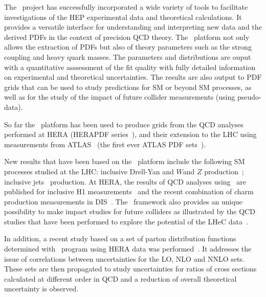 The \fitter\ project has successfully incorporated a wide variety
of tools to facilitate investigations of the HEP experimental data
and theoretical calculations. It provides a versatile interface
for understanding and interpreting new data and the derived PDFs
in the context of precision QCD theory.
The \fitter\ platform not only allows the extraction of PDFs but also of theory 
parameters such as the strong coupling and heavy quark masses. The parameters and distributions are ouput with a
quantitative asssessment of the fit quality with fully detailed information on 
experimental and theoretical uncertainties.
The results are also output to PDF grids that can be used to study predictions for SM or beyond SM processes, as well as for the study of the impact of 
future collider measurements (using pseudo-data).


So far the \fitter\ platform has been used to produce grids 
from the QCD analyses performed at 
HERA (HERAPDF series~\cite{h1zeus:2009wt}), and their extension to the LHC 
using 
measurements from ATLAS~\cite{atlas:strange,atlas:jets} (the first ever ATLAS PDF sets~\cite{atlas:grids}).

New results that have been based on the \fitter\ platform include 
the following SM processes 
studied at the LHC:  inclusive Drell-Yan and $W$and $Z$ 
production~\cite{atlas:strange,atlas:hm,cms:strange};
inclusive jets~\cite{atlas:jets,cms:jets} production.
At HERA, the results of QCD analyses using \fitter\ are 
published for inclusive H1 measurements~\cite{h1:2012kk}
and the recent combination of charm production measurements 
in DIS~\cite{h1zeus:charm}.
The \fitter\ framework also provides an unique possibility to 
make impact studies for future colliders
as illustrated by the QCD studies that have been performed to 
explore the potential of the LHeC data~\cite{lhec:studies}.

In addition, a recent study based on a set of parton distribution functions 
determined with \fitter\ program using HERA data was performed~\cite{hfcorrpaper}.
It addresses the issue of correlations between uncertainties for the LO,
NLO and NNLO sets. These sets are then propagated to study uncertainties 
for ratios of cross sections calculated at different order in QCD and  
a reduction of overall theoretical uncertainty is observed.

